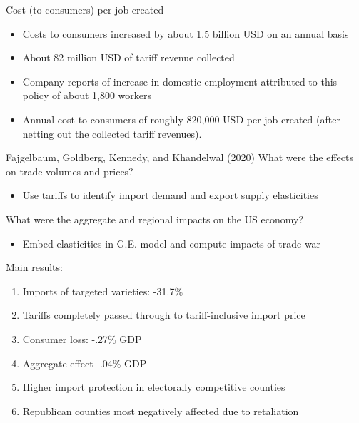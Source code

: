 \documentclass[11pt,notes=hide,aspectratio=169]{beamer}
\begin{document}
\begin{frame}{Cost (to consumers) per job created }
\begin{itemize}
\item Costs to consumers increased by about 1.5 billion USD on an annual basis 
\item About 82 million USD of tariff revenue collected 
\item Company reports of increase in domestic employment attributed to this policy of about 1,800 workers
\item Annual cost to consumers of roughly 820,000 USD per job created (after netting out the collected tariff revenues).
\end{itemize}
\end{frame}
\begin{frame}{ Fajgelbaum, Goldberg, Kennedy, and Khandelwal (2020)}
What were the effects on trade volumes and prices?
\begin{itemize}
	\item Use tariffs to identify import demand and export supply elasticities
\end{itemize}
What were the aggregate and regional impacts on the US economy?
\begin{itemize}
	\item Embed elasticities in G.E. model and compute impacts of trade war
\end{itemize}
Main results:
\begin{enumerate}
	\item Imports of targeted varieties: -31.7\%
	\item Tariffs completely passed through to tariff-inclusive import price
	\item Consumer loss: -.27\% GDP
	\item[] Aggregate effect -.04\% GDP
	\item Higher import protection in electorally competitive counties
	\item[] Republican counties most negatively affected due to retaliation
\end{enumerate}
\end{frame}
\end{document}
